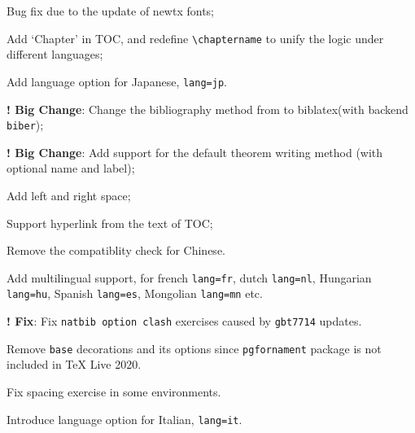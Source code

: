 \documentclass[11pt]{elegantbook}
\begin{document}

\begin{change}
  \item Bug fix due to the update of newtx fonts;
  \item Add `Chapter' in TOC, and redefine \lstinline{\chaptername} to unify the logic under different languages;
  \item Add language option for Japanese, \lstinline{lang=jp}.
\end{change}



\begin{change}
  \item \textbf{! Big Change}: Change the bibliography method from  to biblatex(with backend  \lstinline{biber});
  \item \textbf{! Big Change}: Add support for the default theorem writing method (with optional name and label);
  \item Add left and right space;
  \item Support hyperlink from the text of TOC;
  \item Remove the  compatiblity check for Chinese.
  \item Add multilingual support, for french \lstinline{lang=fr}, dutch \lstinline{lang=nl}, Hungarian  \lstinline{lang=hu}, Spanish \lstinline{lang=es}, Mongolian \lstinline{lang=mn} etc.
\end{change}



\begin{change}
  \item \textbf{! Fix}: Fix \lstinline{natbib option clash} exercises caused by \lstinline{gbt7714} updates.
  \item Remove \lstinline{base} decorations and its options since \lstinline{pgfornament} package is not included in \TeX{} Live 2020.
  \item Fix spacing exercise in some environments.
  \item Introduce language option for Italian, \lstinline{lang=it}.
\end{change}


\end{document}
